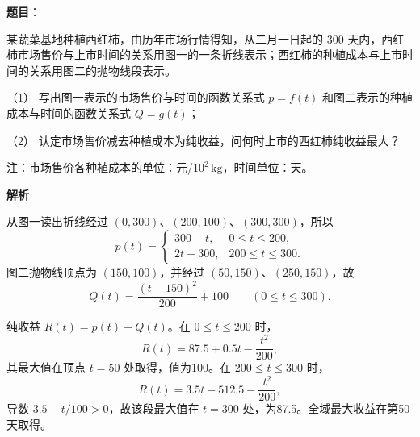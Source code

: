 \begin{answer}

\textbf{题目}：

某蔬菜基地种植西红柿，由历年市场行情得知，从二月一日起的 300 天内，西红柿市场售价与上市时间的关系用图一的一条折线表示；西红柿的种植成本与上市时间的关系用图二的抛物线段表示。

（1） 写出图一表示的市场售价与时间的函数关系式 $p=f(t)$ 和图二表示的种植成本与时间的函数关系式 $Q=g(t)$；

（2） 认定市场售价减去种植成本为纯收益，问何时上市的西红柿纯收益最大？

注：市场售价各种植成本的单位：元/$10^2\,\mathrm{kg}$，时间单位：天。
\nopagebreak[4]
\begin{center}\end{center}
\nopagebreak[4]
\textbf{解析}


从图一读出折线经过 $(0,300)$、$(200,100)$、$(300,300)$，所以
\nopagebreak[4]
\[
p(t)=\begin{cases}300-t,&0\le t\le200,\\2t-300,&200\le t\le300.\end{cases}
\]
图二抛物线顶点为 $(150,100)$，并经过 $(50,150)$、$(250,150)$，故
\nopagebreak[4]
\[
Q(t)=\frac{(t-150)^2}{200}+100\qquad(0\le t\le300).
\]

纯收益 $R(t)=p(t)-Q(t)$。在 $0\le t\le200$ 时，
\nopagebreak[4]
\[
R(t)=87.5+0.5t-\frac{t^2}{200},
\]
其最大值在顶点 $t=50$ 处取得，值为100。在 $200\le t\le300$ 时，
\nopagebreak[4]
\[
R(t)=3.5t-512.5-\frac{t^2}{200},
\]
导数 $3.5-t/100>0$，故该段最大值在 $t=300$ 处，为87.5。全域最大收益在第50天取得。



\end{answer}
